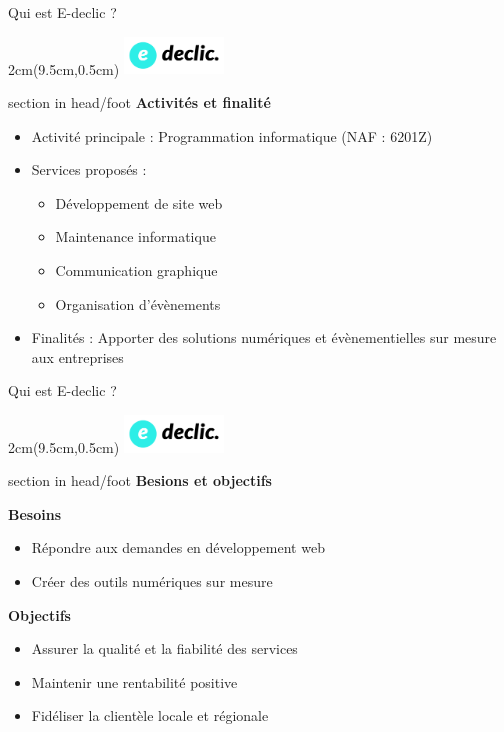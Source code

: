 \documentclass{beamer}
\newcommand{\logoEdeclic}{
	\begin{textblock*}{2cm}(9.5cm,0.5cm)
  		\includegraphics[height=1cm]{../img/logo_e-declic.png}
	\end{textblock*}
}
\begin{document}
\begin{frame}{Qui est E-declic ?}
	\logoEdeclic

	\begin{beamercolorbox}[wd=\paperwidth,ht=1.5em,dp=0.5em,leftskip=0.5cm]{section in head/foot}
  		\large \textbf{Activités et finalité}
	\end{beamercolorbox}
	\vspace{0.5em}
	\begin{center}
  		\begin{minipage}{0.9\textwidth}
			\begin{itemize}
  				\item Activité principale : Programmation informatique (NAF : 6201Z)
  				\item Services proposés :
  				\begin{itemize}
  					\item Développement de site web
  					\item Maintenance informatique
  					\item Communication graphique
  					\item Organisation d'évènements
  				\end{itemize}
  				\item Finalités : Apporter des solutions numériques et évènementielles sur mesure aux entreprises
  			\end{itemize}
  		\end{minipage}
	\end{center}
	\vfill
\end{frame}

\begin{frame}{Qui est E-declic ?}
	\logoEdeclic
	
	\begin{beamercolorbox}[wd=\paperwidth,ht=1.5em,dp=0.5em,leftskip=0.5cm]{section in head/foot}
  		\large \textbf{Besions et objectifs}
	\end{beamercolorbox}
	\vspace{0.5em}
	\begin{center}
  		\begin{minipage}{0.9\textwidth}
			\textbf{Besoins}
			\begin{itemize}
				\item Répondre aux demandes en développement web
				\item Créer des outils numériques sur mesure
			\end{itemize}
	
			\textbf{Objectifs}
			\begin{itemize}
				\item Assurer la qualité et la fiabilité des services
				\item Maintenir une rentabilité positive
				\item Fidéliser la clientèle locale et régionale
			\end{itemize}
  		\end{minipage}
	\end{center}
	\vfill
\end{frame}
\end{document}
